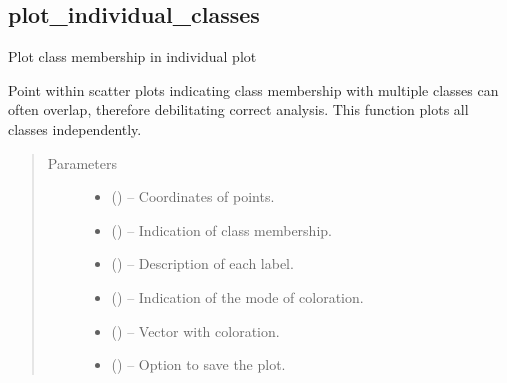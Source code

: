 \documentclass[a4paper,10pt,english]{sphinxmanual}
\begin{document}
\subsection{plot\_individual\_classes}
\label{\detokenize{api/ucf.plot_individual_classes:plot-individual-classes}}\label{\detokenize{api/ucf.plot_individual_classes::doc}}

\begin{fulllineitems}
\label{\detokenize{api/ucf.plot_individual_classes:ucf.plot_individual_classes}}
Plot class membership in individual plot

Point within scatter plots indicating class membership with multiple
classes can often overlap, therefore debilitating correct analysis. This
function plots all classes independently.
\begin{quote}\begin{description}
\item[{Parameters}] \leavevmode\begin{itemize}
\item {} 
 () -- Coordinates of points.

\item {} 
 () -- Indication of class membership.

\item {} 
 () -- Description of each label.

\item {} 
 () -- Indication of the mode of coloration.

\item {} 
 () -- Vector with coloration.

\item {} 
 () -- Option to save the plot.


\end{itemize}
\end{description}
\end{quote}
\end{fulllineitems}
\end{document}
